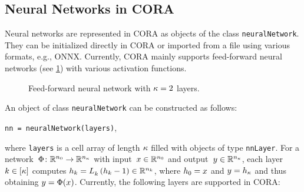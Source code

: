 \subsection{Neural Networks in CORA}
\label{sec:neuralNetworkInit}

Neural networks are represented in CORA as objects of the class \texttt{neuralNetwork}.
They can be initialized directly in CORA or imported from a file using various formats, e.g., ONNX.
Currently, CORA mainly supports feed-forward neural networks (see \cref{fig:neuralNetwork}) with various activation functions.

\begin{figure}[htb]
  \centering	
    \footnotesize
    \caption{Feed-forward neural network with $\kappa = 2$ layers.}
    \label{fig:neuralNetwork}
\end{figure}

An object of class \texttt{neuralNetwork} can be constructed as follows:
\begin{center}
	\texttt{nn = neuralNetwork(layers)},
\end{center}
where \texttt{layers} is a cell array of length $\kappa$ filled with objects of type \texttt{nnLayer}.
For a network~$\Phi\colon\mathbb{R}^{n_0}\to\mathbb{R}^{n_{\kappa}}$ with input~$x\in\mathbb{R}^{n_0}$ and output~$y\in\mathbb{R}^{n_{\kappa}}$,
each layer $k\in[\kappa]$ computes $h_k = L_{k}^\text{}\left(h_k-1\right)\in\mathbb{R}^{n_k}$,
where $h_0 = x$ and $y = h_{\kappa}$ and thus obtaining $y=\Phi(x)$.
Currently, the following layers are supported in CORA:

